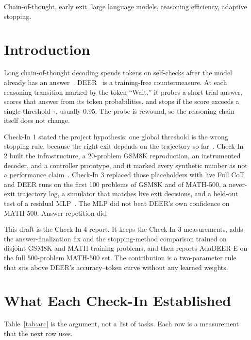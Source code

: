 \documentclass[conference]{IEEEtran}
\begin{document}
\begin{IEEEkeywords}
Chain-of-thought, early exit, large language models, reasoning efficiency, adaptive stopping.
\end{IEEEkeywords}

\section{Introduction}
Long chain-of-thought decoding spends tokens on self-checks after the model already has an answer~\cite{wei2022cot,deepseekr1}.
DEER~\cite{yang2025deer} is a training-free countermeasure.
At each reasoning transition marked by the token ``Wait,'' it probes a short trial answer, scores that answer from its token probabilities, and stops if the score exceeds a single threshold $\tau$, usually $0.95$.
The probe is rewound, so the reasoning chain itself does not change.

Check-In 1 stated the project hypothesis: one global threshold is the wrong stopping rule, because the right exit depends on the trajectory so far~\cite{checkin1}.
Check-In 2 built the infrastructure, a 20-problem GSM8K reproduction, an instrumented decoder, and a controller prototype, and it marked every synthetic number as not a performance claim~\cite{checkin2}.
Check-In 3 replaced those placeholders with live Full CoT and DEER runs on the first 100 problems of GSM8K and of MATH-500, a never-exit trajectory log, a simulator that matches live exit decisions, and a held-out test of a residual MLP~\cite{checkin3}.
The MLP did not beat DEER's own confidence on MATH-500.
Answer repetition did.

This draft is the Check-In 4 report.
It keeps the Check-In 3 measurements, adds the answer-finalization fix and the stopping-method comparison trained on disjoint GSM8K and MATH training problems, and then reports AdaDEER-E on the full 500-problem MATH-500 set.
The contribution is a two-parameter rule that sits above DEER's accuracy--token curve without any learned weights.

\section{What Each Check-In Established}
Table~\ref{tab:arc} is the argument, not a list of tasks.
Each row is a measurement that the next row uses.
\end{document}
